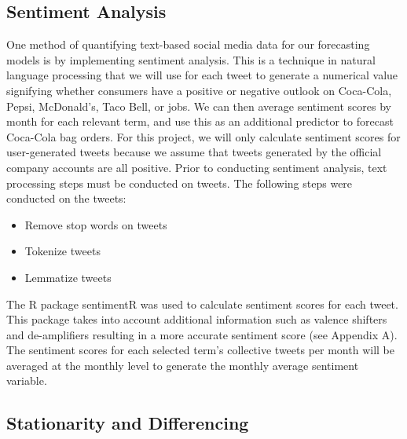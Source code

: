 \documentclass[12pt,oneside]{chicagocapstone}
\providecommand{\tightlist}{%
  \setlength{\itemsep}{0pt}\setlength{\parskip}{0pt}}
\begin{document}
\subsection*{Sentiment Analysis}\label{sentiment-analysis}

One method of quantifying text-based social media data for our
forecasting models is by implementing sentiment analysis. This is a
technique in natural language processing that we will use for each tweet
to generate a numerical value signifying whether consumers have a
positive or negative outlook on Coca-Cola, Pepsi, McDonald's, Taco Bell,
or jobs. We can then average sentiment scores by month for each relevant
term, and use this as an additional predictor to forecast Coca-Cola bag
orders. For this project, we will only calculate sentiment scores for
user-generated tweets because we assume that tweets generated by the
official company accounts are all positive. Prior to conducting
sentiment analysis, text processing steps must be conducted on tweets.
The following steps were conducted on the tweets:
\begin{itemize}
\tightlist
\item
  Remove stop words on tweets
\item
  Tokenize tweets
\item
  Lemmatize tweets
\end{itemize}
The R package sentimentR was used to calculate sentiment scores for each
tweet. This package takes into account additional information such as
valence shifters and de-amplifiers resulting in a more accurate
sentiment score (see Appendix A). The sentiment scores for each selected
term's collective tweets per month will be averaged at the monthly level
to generate the monthly average sentiment variable.

\subsection*{Stationarity and
Differencing}\label{stationarity-and-differencing}
\end{document}

